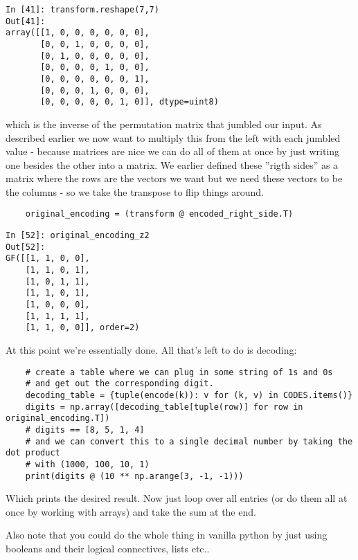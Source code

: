 \documentclass[a4paper,11pt]{article}
\begin{document}
\begin{verbatim}
In [41]: transform.reshape(7,7)                                                 
Out[41]: 
array([[1, 0, 0, 0, 0, 0, 0],
       [0, 0, 1, 0, 0, 0, 0],
       [0, 1, 0, 0, 0, 0, 0],
       [0, 0, 0, 0, 1, 0, 0],
       [0, 0, 0, 0, 0, 0, 1],
       [0, 0, 0, 1, 0, 0, 0],
       [0, 0, 0, 0, 0, 1, 0]], dtype=uint8)
\end{verbatim}

which is the inverse of the permutation matrix that jumbled our input.
As described earlier we now want to multiply this from the left with each jumbled value - because matrices are nice we can do all of them at once by just writing one besides the other into a matrix. We earlier defined these ''rigth sides'' as a matrix where the rows are the vectors we want but we need these vectors to be the columns - so we take the transpose to flip things around.

\begin{verbatim}
    original_encoding = (transform @ encoded_right_side.T)
\end{verbatim}

\begin{verbatim}
In [52]: original_encoding_z2                             
Out[52]: 
GF([[1, 1, 0, 0],
    [1, 1, 0, 1],
    [1, 0, 1, 1],
    [1, 1, 0, 1],
    [1, 0, 0, 0],
    [1, 1, 1, 1],
    [1, 1, 0, 0]], order=2)
\end{verbatim}

At this point we're essentially done. All that's left to do is decoding:

\begin{verbatim}
    # create a table where we can plug in some string of 1s and 0s 
    # and get out the corresponding digit.
    decoding_table = {tuple(encode(k)): v for (k, v) in CODES.items()}
    digits = np.array([decoding_table[tuple(row)] for row in original_encoding.T])
    # digits == [8, 5, 1, 4]
    # and we can convert this to a single decimal number by taking the dot product
    # with (1000, 100, 10, 1)
    print(digits @ (10 ** np.arange(3, -1, -1)))
\end{verbatim}

Which prints the desired result. Now just loop over all entries (or do them all at once by working with arrays) and take the sum at the end.

Also note that you could do the whole thing in vanilla python by just using booleans and their logical connectives, lists etc..
\end{document}
